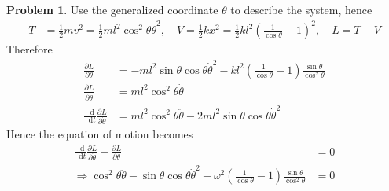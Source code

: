 \documentclass[twoside,11pt]{article}
\renewcommand*\d{\mathop{}\!\mathrm{d}}
\theoremstyle{definition}
\newtheorem{problem}{Problem}
\theoremstyle{remark}
\begin{document}
\begin{problem}
Use the generalized coordinate $\theta$ to describe the system,
hence
\begin{align*}
    T &= 
    \frac{1}{2}mv^2 = \frac{1}{2}ml^2\cos^2\theta\dot{\theta}^2,\quad
    V = \frac{1}{2}kx^2 
    = \frac{1}{2}kl^2\left(\frac{1}{\cos\theta}-1\right)^2,\quad
    L = T-V
\end{align*}
Therefore
\begin{align*}
    \frac{\partial L}{\partial\theta} &= 
    -ml^2\sin\theta\cos\theta\dot{\theta}^2 - kl^2\left(\frac{1}{\cos\theta}-1\right)
    \frac{\sin\theta}{\cos^2\theta}\\
    \frac{\partial L}{\partial\dot{\theta}} &= 
    ml^2\cos^2\theta\dot{\theta}\\
    \frac{\d}{\d t}\frac{\partial L}{\partial\dot{\theta}} &= 
    ml^2\cos^2\theta\ddot{\theta} - 2ml^2\sin\theta\cos\theta\dot{\theta}^2
\end{align*}
Hence the equation of motion becomes
\begin{align*}
    \frac{\d}{\d t}\frac{\partial L}{\partial\dot{\theta}}
    - \frac{\partial L}{\partial\theta}
    &= 0\\
    \Rightarrow
    \cos^2\theta\ddot{\theta} - \sin\theta\cos\theta\dot{\theta}^2
    + \omega^2\left(\frac{1}{\cos\theta}-1\right)\frac{\sin\theta}{\cos^2\theta}
    &= 0
\end{align*}

\end{problem}


\end{document}
